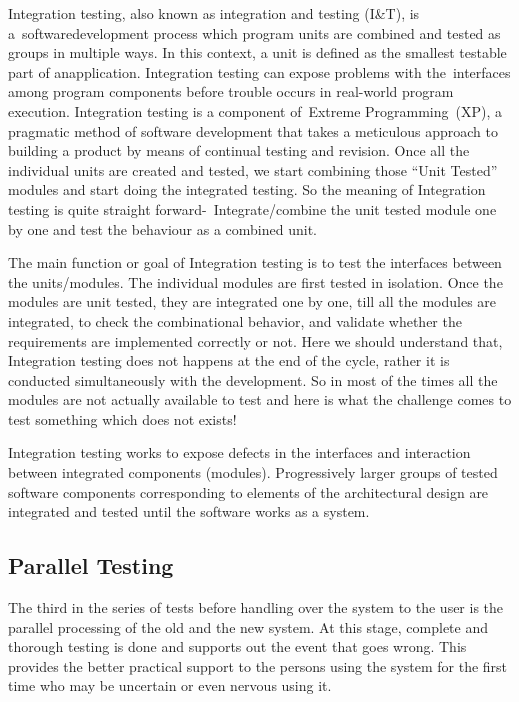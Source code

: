 Integration testing, also known as integration and testing (I\&T), is a softwaredevelopment process which program units are combined and tested as groups in multiple ways. In this context, a unit is defined as the smallest testable part of anapplication. Integration testing can expose problems with the interfaces among program components before trouble occurs in real-world program execution. Integration testing is a component of Extreme Programming (XP), a pragmatic method of software development that takes a meticulous approach to building a product by means of continual testing and revision.
Once all the individual units are created and tested, we start combining those “Unit Tested” modules and start doing the integrated testing. So the meaning of Integration testing is quite straight forward- Integrate/combine the unit tested module one by one and test the behaviour as a combined unit.

The main function or goal of Integration testing is to test the interfaces between the units/modules.
The individual modules are first tested in isolation. Once the modules are unit tested, they are integrated one by one, till all the modules are integrated, to check the combinational behavior, and validate whether the requirements are implemented correctly or not.
Here we should understand that, Integration testing does not happens at the end of the cycle, rather it is conducted simultaneously with the development. So in most of the times all the modules are not actually available to test and here is what the challenge comes to test something which does not exists!

Integration testing works to expose defects in the interfaces and interaction between integrated components (modules). Progressively larger groups of tested software components corresponding to elements of the architectural design are integrated and tested until the software works as a system.

\subsection{Parallel Testing}
The third in the series of tests before handling over the system to the user is the parallel processing of the old and the new system. At this stage, complete and thorough testing is done and supports out the event that goes wrong. This provides the better practical support to the persons using the system for the first time who may be uncertain or even nervous using it.


